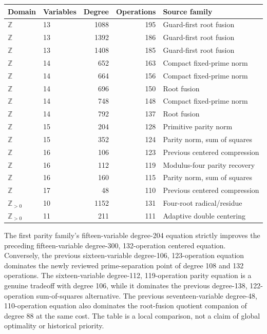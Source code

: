 \begin{center}
\small
\begin{tabular}{llrrl}
Domain & Variables & Degree & Operations & Source family\\ \hline
$\mathbb Z$ & 13 & 1088 & 195 & Guard-first root fusion\\
$\mathbb Z$ & 13 & 1392 & 186 & Guard-first root fusion\\
$\mathbb Z$ & 13 & 1408 & 185 & Guard-first root fusion\\
$\mathbb Z$ & 14 & 652 & 163 & Compact fixed-prime norm\\
$\mathbb Z$ & 14 & 664 & 156 & Compact fixed-prime norm\\
$\mathbb Z$ & 14 & 696 & 150 & Root fusion\\
$\mathbb Z$ & 14 & 748 & 148 & Compact fixed-prime norm\\
$\mathbb Z$ & 14 & 792 & 137 & Root fusion\\
$\mathbb Z$ & 15 & 204 & 128 & Primitive parity norm\\
$\mathbb Z$ & 15 & 352 & 124 & Parity norm, sum of squares\\
$\mathbb Z$ & 16 & 106 & 123 & Previous centered compression\\
$\mathbb Z$ & 16 & 112 & 119 & Modulus-four parity recovery\\
$\mathbb Z$ & 16 & 160 & 115 & Parity norm, sum of squares\\
$\mathbb Z$ & 17 & 48 & 110 & Previous centered compression\\
$\mathbb Z_{>0}$ & 10 & 1152 & 131 & Four-root radical/residue\\
$\mathbb Z_{>0}$ & 11 & 211 & 111 & Adaptive double centering\\
\end{tabular}
\end{center}

The first parity family's fifteen-variable degree-204 equation strictly
improves the preceding fifteen-variable degree-300, 132-operation
centered equation.  Conversely, the previous sixteen-variable
degree-106, 123-operation equation dominates the newly reviewed
prime-separation point of degree 108 and 132 operations.  The
sixteen-variable degree-112, 119-operation parity equation is a genuine
tradeoff with degree 106, while it dominates the previous
degree-138, 122-operation sum-of-squares alternative.  The previous
seventeen-variable degree-48, 110-operation equation also dominates
the root-fusion quotient companion of degree 88 at the same cost.
The table is a local comparison, not a claim of global optimality or
historical priority.

